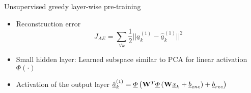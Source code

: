 		\begin{frame}[t]{Unsupervised greedy layer-wise pre-training}
		
		\begin{minipage}[t]{0.48\linewidth}
			\begin{figure}
			\end{figure}
		\end{minipage}\hfill
		\begin{minipage}[t]{0.48\linewidth}
			\begin{itemize}					
				\item Reconstruction error
					\begin{equation}
						J_{AE} = \sum_{\forall k} \frac{1}{2} ||\underline{a}^{(1)}_k -
\hat{\underline{a}}^{(1)}_k||^2 \nonumber
					\end{equation}				
				\item Small hidden layer: Learned subspace similar to PCA for linear activation
$\underline{\Phi}(\cdot)$
			\end{itemize}
		\end{minipage}
		\vspace{1cm}
		\begin{itemize}
		\item Activation of the output layer
			$ \hat{\underline{a}}^{(1)}_k = \underline{\Phi} \left (  {\bf W}^T \underline{\Phi} \left ( {\bf W}
\underline{x}_k  + \underline{b}_{enc} \right ) + \underline{b}_{rec} \right )$
		\end{itemize}
	\end{frame}
	
